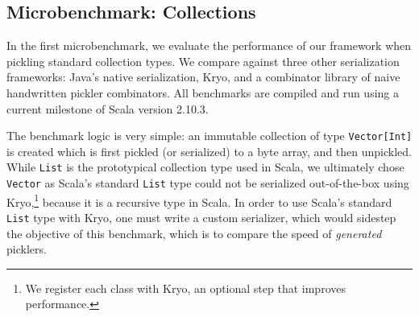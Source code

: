 \subsection{Microbenchmark: Collections}

In the first microbenchmark, we evaluate the performance of our
framework when pickling standard collection types. We compare against
three other serialization frameworks: Java's native serialization,
Kryo, and a combinator library of naive handwritten pickler combinators. All
benchmarks are compiled and run using a current milestone of Scala version 2.10.3.

The benchmark logic is very simple: an immutable collection of type
\verb|Vector[Int]| is created which is first pickled (or serialized)
to a byte array, and then unpickled. While \verb|List| is the prototypical collection type used in Scala, we ultimately chose \verb|Vector| as
Scala's standard \verb|List| type could not be serialized out-of-the-box using Kryo,\footnote{We register each class with Kryo, an optional step that improves performance.} because it is a recursive type in Scala. In order to use Scala's standard \verb|List| type with Kryo, one must write a custom serializer, which would sidestep the objective of this benchmark, which is to compare the speed of {\em generated} picklers.

